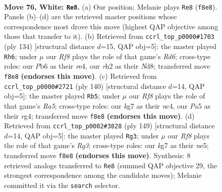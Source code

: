 \documentclass[11pt]{article}
\begin{document}
\clearpage

\begin{figure}[p]\centering
\begin{subfigure}{0.46\textwidth}\centering
\resizebox{\linewidth}{!}{%
\newchessgame
\chessboard[
  setfen={5R2/6k1/1P5n/P7/8/1K6/7r/8 w - - 15 76},
  showmover=false,
  pgfstyle=straightmove, color=movearrow, markmove={f8-e8}
]}
\caption{}
\end{subfigure}\hfill
\begin{subfigure}{0.46\textwidth}\centering
\resizebox{\linewidth}{!}{%
\newchessgame
\chessboard[
  setfen={3Nn3/8/3R4/1k3P2/4r3/8/2K5/8 w - - 19 68},
  showmover=false,
  pgfstyle=straightmove, color=movearrow, markmove={d6-h6}
]}
\caption{}
\end{subfigure}
\\[4pt]
\begin{subfigure}{0.46\textwidth}\centering
\resizebox{\linewidth}{!}{%
\newchessgame
\chessboard[
  setfen={8/8/6P1/R7/2nk2r1/8/8/3K4 w - - 1 71},
  showmover=false,
  pgfstyle=straightmove, color=movearrow, markmove={a5-b5}
]}
\caption{}
\end{subfigure}\hfill
\begin{subfigure}{0.46\textwidth}\centering
\resizebox{\linewidth}{!}{%
\newchessgame
\chessboard[
  setfen={8/8/6r1/3pN3/k2K4/8/8/1R6 b - - 18 75},
  showmover=false,
  pgfstyle=straightmove, color=movearrow, markmove={g6-g3}
]}
\caption{}
\end{subfigure}
\caption{\textbf{Move 76, White: \texttt{Re8}.} (a) Our position; Melanie plays \texttt{Re8} (\texttt{f8e8}). Panels (b)--(d) are the retrieved master positions whose correspondence most drove this move (highest QAP objective among those that transfer to it). (b) Retrieved from \texttt{ccrl\_top\_p0000\#1703} (ply 134) [structural distance $d$=15, QAP obj=5]: the master played \texttt{Rh6}; under $\mu$ our \emph{Rf8} plays the role of that game's \emph{Rd6}; cross-type roles: our \emph{P}b6 as their \emph{r}e4, our \emph{r}h2 as their \emph{N}d8; transferred move \texttt{f8e8} \textbf{(endorses this move)}. (c) Retrieved from \texttt{ccrl\_top\_p0000\#2721} (ply 140) [structural distance $d$=14, QAP obj=5]: the master played \texttt{Rb5}; under $\mu$ our \emph{Rf8} plays the role of that game's \emph{Ra5}; cross-type roles: our \emph{k}g7 as their \emph{n}c4, our \emph{P}a5 as their \emph{r}g4; transferred move \texttt{f8e8} \textbf{(endorses this move)}. (d) Retrieved from \texttt{ccrl\_top\_p0002\#3828} (ply 149) [structural distance $d$=14, QAP obj=5]: the master played \texttt{Rg3}; under $\mu$ our \emph{Rf8} plays the role of that game's \emph{Rg3}; cross-type roles: our \emph{k}g7 as their \emph{n}e5; transferred move \texttt{f8e8} \textbf{(endorses this move)}. Synthesis: 8 retrieved analogs transferred to \texttt{Re8} (summed QAP objective 29, the strongest correspondence among the candidate moves); Melanie committed it via the \texttt{search} selector.}
\label{fig:thought-m150}
\end{figure}
\end{document}
